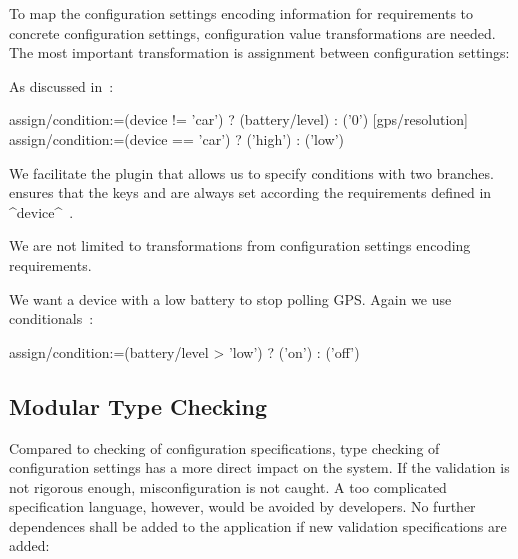 To map the configuration settings encoding information for requirements to concrete configuration settings, configuration value transformations are needed.
The most important transformation is assignment between configuration settings:

\begin{example}
As discussed in~\cite{raab2016improving}:

\begin{code}
  assign/condition:=(device != 'car') ? (battery/level) : ('0')
[gps/resolution]
  assign/condition:=(device == 'car') ? ('high') : ('low')
\end{code}

We facilitate the plugin  that allows us to specify conditions with two branches.
 ensures that the keys  and  are always set according the requirements defined in ^device^~\cite{raab2016improving}.
\end{example}

We are not limited to transformations from configuration settings encoding requirements.

\begin{example}
We want a device with a low battery to stop polling GPS.
Again we use conditionals~\cite{raab2016improving}:


\begin{code}
  assign/condition:=(battery/level > 'low') ?  ('on') : ('off')
\end{code}
\phantom{}
\end{example}


\subsection{Modular Type Checking}
\label{sec:backend-type}

Compared to checking of configuration specifications, type checking of configuration settings has a more direct impact on the system.
If the validation is not rigorous enough, misconfiguration is not caught.
A too complicated specification language, however, would be avoided by developers.
No further dependences shall be added to the application if new validation specifications are added:
\reqDependences*

